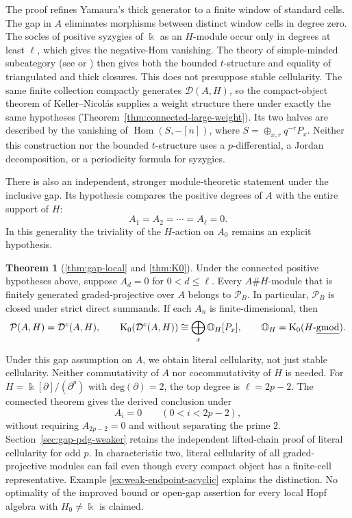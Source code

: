\documentclass[11pt]{article}
\theoremstyle{definition}
\newtheorem*{thm*}{Theorem}
\numberwithin{equation}{section}
\def\udgmod{\mbox{-\underline{gmod}}}
\newcommand{\kk}{\Bbbk}
\newcommand{\Pun}{\mathcal{P}_B}
\newcommand{\Tcat}{\mathcal{P}(A,H)}
\newcommand{\Dc}{\mathcal{D}^c(A,H)}
\newcommand{\Hom}{\operatorname{Hom}}
\newcommand{\K}{\operatorname{K}_0}
\newcommand{\Der}{\mathcal{D}}
\begin{document}
The proof refines Yamaura's thick generator \cite{Yamaura} to a finite window of standard
cells.  The gap in $A$ eliminates morphisms between distinct window cells in
degree zero.  The socles of positive syzygies of $\kk$ as an $H$-module occur only in
degrees at least $\ell$, which gives the negative-Hom vanishing.
The theory of simple-minded subcategory (see \cite[Proposition 5.4]{KY14} or \cite[Theorem~4.4]{SchSimple})
then gives both the bounded $t$-structure and equality of triangulated
and thick closures.  This does not presuppose stable cellularity.
The same finite collection compactly generates $\Der(A,H)$, so the
compact-object theorem of Keller--Nicol\'as supplies a weight structure
there under exactly the same hypotheses
(Theorem~\ref{thm:connected-large-weight}).  Its two halves are described
by the vanishing of $\Hom(S,-[n])$, where
$S=\oplus_{x,r}q^{-r}P_x$.  Neither this construction nor the bounded
$t$-structure uses a $p$-differential, a Jordan decomposition, or a
periodicity formula for syzygies.

There is also an independent, stronger module-theoretic statement under
the inclusive gap.  Its hypothesis compares the positive degrees of
$A$ with the entire support of $H$:
\[
 A_1=A_2=\cdots=A_\ell=0.
\]
In this generality the triviality of the $H$-action on $A_0$ remains an
explicit hypothesis.

\begin{thm*}[\ref{thm:gap-local} and \ref{thm:K0}]
Under the connected positive hypotheses above, suppose
$A_d=0$ for $0<d\leq \ell$. Every
$A\#H$-module that is finitely generated graded-projective over $A$ belongs
to $\Pun$.  In particular, $\Pun$ is closed under strict direct summands.
If each $A_n$ is finite-dimensional, then
\[
 \Tcat=\Dc,
 \qquad
 \K(\Dc)\cong\bigoplus_x\mathbb O_H[P_x],
 \qquad \mathbb O_H=\K(H\udgmod).
\]
\end{thm*}

Under this gap assumption on $A$, we obtain literal cellularity, not just stable cellularity.
Neither commutativity of $A$ nor cocommutativity of $H$ is needed.
For $H=\kk[\partial]/(\partial^p)$ with $\mathrm{deg}(\partial)=2$, the top degree is
$\ell=2p-2$.  The connected theorem gives the derived conclusion under
\[
 A_i=0\qquad(0<i<2p-2),
\]
without requiring $A_{2p-2}=0$ and without separating the prime $2$.
Section~\ref{sec:gap-pdg-weaker} retains the independent lifted-chain
proof of literal cellularity for odd $p$.  In characteristic two,
literal cellularity of all graded-projective modules can fail even
though every compact object has a finite-cell representative.
Example \ref{ex:weak-endpoint-acyclic} explains the distinction.  No optimality
of the improved bound or open-gap assertion for every local Hopf
algebra with $H_0\ne\kk$ is claimed.
\end{document}
